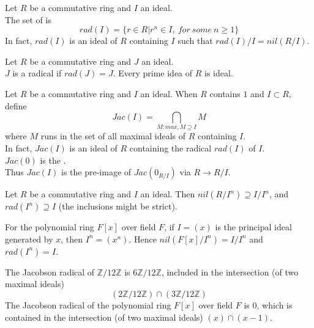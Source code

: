 \begin{definition}
Let $R$ be a commutative ring and $I$ an ideal.\\
The set of  is 
\begin{equation}
rad(I) = \{ r \in R | r^n \in I, \ for \ some \ n \geq 1\} \nonumber
\end{equation}
In fact, $rad(I)$ is an ideal of $R$ containing $I$ such that $rad(I)/I = nil(R/I)$.\\
\end{definition}


\begin{definition}
Let $R$ be a commutative ring and $J$ an ideal.\\
$J$ is a radical if $rad(J) = J$. Every prime idea of $R$ is ideal.\\
\end{definition}


\begin{definition}
Let $R$ be a commutative ring and $I$ an ideal.
When $R$ contains $1$ and $I \subset R$, define 
\begin{equation}
Jac(I) = \bigcap_{M: max, M \supseteq I} M \nonumber
\end{equation}
where $M$ runs in the set of all maximal ideals of $R$ containing $I$.\\
In fact, $Jac(I)$ is an ideal of $R$ containing the radical $rad(I)$ of $I$.\\
$Jac(0)$ is the .\\
Thus $Jac(I)$ is the pre-image of $Jac(0_{R/I})$ via $R \rightarrow R/I$.\\
\end{definition}


\begin{remark}
Let $R$ be a commutative ring and $I$ an ideal. Then $nil(R/I^n) \supseteq I/I^n$, and $rad(I^n) \supseteq I$ (the inclusions might be strict).
\end{remark}


\begin{remark}
For the polynomial ring $F[x]$ over field $F$, if $I=(x)$ is the principal ideal generated by $x$, then $I^n = (x^n)$. Hence $nil(F[x]/I^n)=I/I^n$	and $rad(I^n) = I$.
\end{remark}


\begin{remark}
The Jacobson radical of $\mathbb{Z}/12\mathbb{Z}$ is $6\mathbb{Z}/12\mathbb{Z}$, included in the intersection (of two maximal ideals) 
\begin{equation}
(2\mathbb{Z}/12\mathbb{Z}) \cap (3\mathbb{Z}/12\mathbb{Z}) \nonumber
\end{equation}
The Jacobson radical of the polynomial ring $F[x]$ over field $F$ is $0$, which is contained in the intersection (of two maximal ideals) $(x) \cap (x-1)$.\\
\end{remark}


